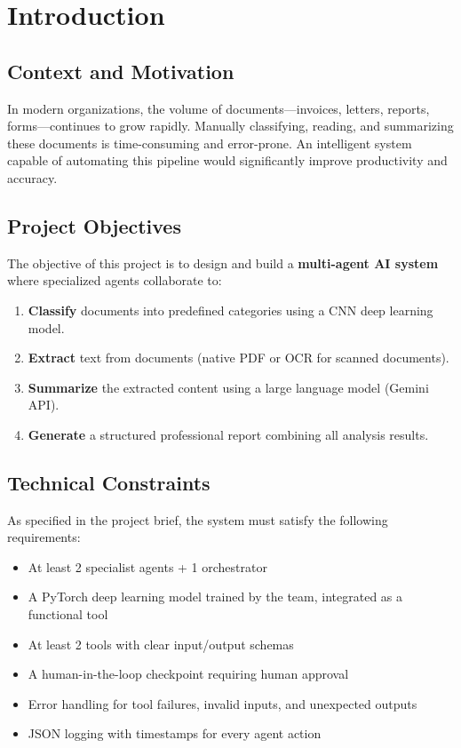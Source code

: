 \documentclass[12pt,a4paper]{article}
\begin{document}
\tableofcontents
\newpage

\section{Introduction}

\subsection{Context and Motivation}
In modern organizations, the volume of documents---invoices, letters, reports, forms---continues to grow rapidly. Manually classifying, reading, and summarizing these documents is time-consuming and error-prone. An intelligent system capable of automating this pipeline would significantly improve productivity and accuracy.

\subsection{Project Objectives}
The objective of this project is to design and build a \textbf{multi-agent AI system} where specialized agents collaborate to:
\begin{enumerate}
    \item \textbf{Classify} documents into predefined categories using a CNN deep learning model.
    \item \textbf{Extract} text from documents (native PDF or OCR for scanned documents).
    \item \textbf{Summarize} the extracted content using a large language model (Gemini API).
    \item \textbf{Generate} a structured professional report combining all analysis results.
\end{enumerate}

\subsection{Technical Constraints}
As specified in the project brief, the system must satisfy the following requirements:
\begin{itemize}
    \item At least 2 specialist agents + 1 orchestrator
    \item A PyTorch deep learning model trained by the team, integrated as a functional tool
    \item At least 2 tools with clear input/output schemas
    \item A human-in-the-loop checkpoint requiring human approval
    \item Error handling for tool failures, invalid inputs, and unexpected outputs
    \item JSON logging with timestamps for every agent action
\end{itemize}
\end{document}
